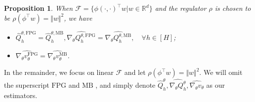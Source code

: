 \documentclass{article}
\newtheorem{proposition}{Proposition}[section]
\numberwithin{equation}{section}
\begin{document}
\begin{proposition}
\label{equiv_mb}
When $\mathcal{F} = \{\phi(\cdot,\cdot)^\top w\vert w\in\mathbb{R}^d\}$ and the regulator $\rho$ is chosen to be $\rho(\phi^\top w) = \Vert w\Vert^2$, we have 
\begin{itemize}
    \item $\widehat{Q}_h^{\theta,\mathrm{FPG}} = \widehat{Q}_h^{\theta,\mathrm{MB}}, \widehat{\nabla_\theta Q_h^{\theta,\mathrm{FPG}}}=\widehat{\nabla_\theta Q_h^{\theta,\mathrm{MB}}}, \quad\forall h\in[H]$;
    \item $\widehat{\nabla_\theta v_\theta^{\mathrm{FPG}}}=\widehat{\nabla_\theta v_\theta^{\mathrm{MB}}}$.
\end{itemize}
\end{proposition}

In the remainder, we focus on linear $\mathcal{F}$ and let $\rho(\phi^\top w) = \Vert w\Vert^2$. We will omit the superscript $\textrm{FPG}$ and $\textrm{MB}$ , and simply denote $\widehat{Q}_h^\theta, \widehat{\nabla_\theta Q_h^\theta}, \widehat{\nabla_\theta v_\theta}$ as our estimators. 
\end{document}

